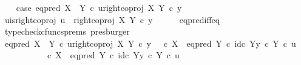 \begin{isabellebody}
\ \ \isamarkupfalse%
\ case{}{\isacharcolon}{\kern0pt}\ {\isachardoublequoteopen}eq{\isacharunderscore}{\kern0pt}pred\ {\isacharparenleft}{\kern0pt}X\ {\isasymCoprod}\ Y{\isacharparenright}{\kern0pt}\ {\isasymcirc}\isactrlsub c\ {\isasymlangle}u{\isacharcomma}{\kern0pt}right{\isacharunderscore}{\kern0pt}coproj\ X\ Y\ {\isasymcirc}\isactrlsub c\ y{\isasymrangle}\ {\isacharequal}{\kern0pt}\ {\isasymt}{\isachardoublequoteclose}\isanewline
\ \ \isamarkupfalse%
\ \isamarkupfalse%
\ u{\isacharunderscore}{\kern0pt}is{\isacharunderscore}{\kern0pt}right{\isacharunderscore}{\kern0pt}coproj{\isacharcolon}{\kern0pt}\ {\isachardoublequoteopen}u\ {\isacharequal}{\kern0pt}\ right{\isacharunderscore}{\kern0pt}coproj\ X\ Y\ {\isasymcirc}\isactrlsub c\ y{\isachardoublequoteclose}\isanewline
\ \ \ \ \isamarkupfalse%
\ eq{\isacharunderscore}{\kern0pt}pred{\isacharunderscore}{\kern0pt}iff{\isacharunderscore}{\kern0pt}eq\ \isamarkupfalse%
\ {\isacharparenleft}{\kern0pt}typecheck{\isacharunderscore}{\kern0pt}cfuncs{\isacharunderscore}{\kern0pt}prems{\isacharcomma}{\kern0pt}\ presburger{\isacharparenright}{\kern0pt}\isanewline
\ \ \isamarkupfalse%
\ {\isachardoublequoteopen}eq{\isacharunderscore}{\kern0pt}pred\ {\isacharparenleft}{\kern0pt}X\ {\isasymCoprod}\ Y{\isacharparenright}{\kern0pt}\ {\isasymcirc}\isactrlsub c\ {\isasymlangle}u{\isacharcomma}{\kern0pt}right{\isacharunderscore}{\kern0pt}coproj\ X\ Y\ {\isasymcirc}\isactrlsub c\ y{\isasymrangle}\ {\isacharequal}{\kern0pt}\ {\isacharparenleft}{\kern0pt}{\isasymf}\ {\isasymcirc}\isactrlsub c\ {\isasymbeta}\isactrlbsub X\isactrlesub {\isacharparenright}{\kern0pt}\ {\isasymamalg}\ {\isacharparenleft}{\kern0pt}eq{\isacharunderscore}{\kern0pt}pred\ Y\ {\isasymcirc}\isactrlsub c\ {\isasymlangle}id\isactrlsub c\ Y{\isacharcomma}{\kern0pt}y\ {\isasymcirc}\isactrlsub c\ {\isasymbeta}\isactrlbsub Y\isactrlesub {\isasymrangle}{\isacharparenright}{\kern0pt}\ {\isasymcirc}\isactrlsub c\ u{\isachardoublequoteclose}\isanewline
\ \ \isamarkupfalse%
\ {\isacharminus}{\kern0pt}\isanewline
\ \ \ \ \isamarkupfalse%
\ {\isachardoublequoteopen}{\isacharparenleft}{\kern0pt}{\isasymf}\ {\isasymcirc}\isactrlsub c\ {\isasymbeta}\isactrlbsub X\isactrlesub {\isacharparenright}{\kern0pt}\ {\isasymamalg}\ {\isacharparenleft}{\kern0pt}eq{\isacharunderscore}{\kern0pt}pred\ Y\ {\isasymcirc}\isactrlsub c\ {\isasymlangle}id\isactrlsub c\ Y{\isacharcomma}{\kern0pt}y\ {\isasymcirc}\isactrlsub c\ {\isasymbeta}\isactrlbsub Y\isactrlesub {\isasymrangle}{\isacharparenright}{\kern0pt}\ {\isasymcirc}\isactrlsub c\ u\isanewline

\end{isabellebody}
